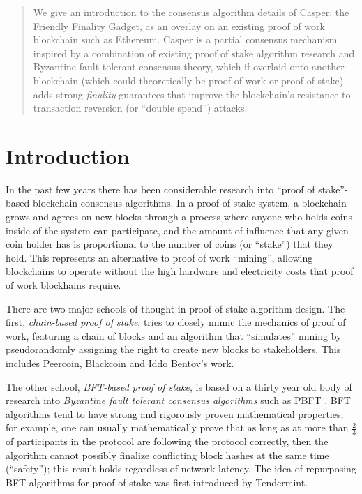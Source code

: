 \documentclass[12pt, final]{article}
\begin{document}
\maketitle

\begin{abstract}
We give an introduction to the consensus algorithm details of Casper: the Friendly Finality Gadget, as an overlay on an existing proof of work blockchain such as Ethereum. Casper is a partial consensus mechanism inspired by a combination of existing proof of stake algorithm research and Byzantine fault tolerant consensus theory, which if overlaid onto another blockchain (which could theoretically be proof of work or proof of stake) adds strong \textit{finality} guarantees that improve the blockchain's resistance to transaction reversion (or ``double spend'') attacks.
\end{abstract}

\section{Introduction}
\label{sect:intro}

In the past few years there has been considerable research into ``proof of stake''-based blockchain consensus algorithms. In a proof of stake system, a blockchain grows and agrees on new blocks through a process where anyone who holds coins inside of the system can participate, and the amount of influence that any given coin holder has is proportional to the number of coins (or ``stake'') that they hold. This represents an alternative to proof of work ``mining'', allowing blockchains to operate without the high hardware and electricity costs that proof of work blockhains require.

There are two major schools of thought in proof of stake algorithm design. The first, \textit{chain-based proof of stake}, tries to closely mimic the mechanics of proof of work, featuring a chain of blocks and an algorithm that ``simulates'' mining by pseudorandomly assigning the right to create new blocks to stakeholders. This includes Peercoin\cite{king2012ppcoin}, Blackcoin\cite{vasin2014blackcoin} and Iddo Bentov's work\cite{bentov2016pos}.

The other school, \textit{BFT-based proof of stake}, is based on a thirty year old body of research into \textit{Byzantine fault tolerant consensus algorithms} such as PBFT \cite{castro1999practical}. BFT algorithms tend to have strong and rigorously proven mathematical properties; for example, one can usually mathematically prove that as long as at more than $\frac{2}{3}$ of participants in the protocol are following the protocol correctly, then the algorithm cannot possibly finalize conflicting block hashes at the same time (``safety''); this result holds regardless of network latency. The idea of repurposing BFT algorithms for proof of stake was first introduced by Tendermint\cite{kwon2014tendermint}.
\end{document}
